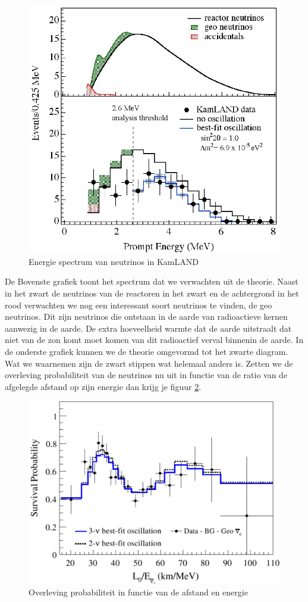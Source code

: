 \documentclass[../main.tex]{subfiles}
\begin{document}
\begin{figure}[h]
    \centering
    \includegraphics[width=0.5\linewidth]{neutrinos/kamland_results.png}
    \caption{Energie spectrum van neutrinos in KamLAND}%
    \label{fig:neutrinos/kamland_results}
\end{figure}

De Bovenste grafiek toont het spectrum dat we verwachten uit de theorie. Naast in het zwart de neutrinos van de reactoren in het zwart en de achtergrond in het rood verwachten we nog een interessant soort neutrinos te vinden, de geo neutrinos. Dit zijn neutrinos die ontstaan in de aarde van radioactieve kernen aanwezig in de aarde. De extra hoeveelheid warmte dat de aarde uitstraalt dat niet van de zon komt moet komen van dit radioactief verval binnenin de aarde. In de onderste grafiek kunnen we de theorie omgevormd tot het zwarte diagram. Wat we waarnemen zijn de zwart stippen wat helemaal anders is. Zetten we de overleving probabiliteit van de neutrinos nu uit in functie van de ratio van de afgelegde afstand op zijn energie dan krijg je figuur \ref{fig:neutrinos/kamland_osc}.

\begin{figure}[h]
    \centering
    \includegraphics[width=0.6\linewidth]{neutrinos/kamland_osc.png}
    \caption{Overleving probabiliteit in functie van de afstand en energie}%
    \label{fig:neutrinos/kamland_osc}
\end{figure}
\end{document}
